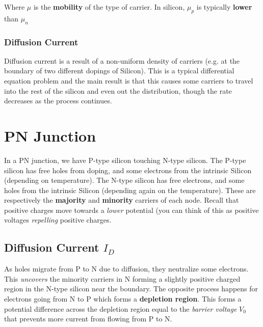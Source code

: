 \documentclass[11pt]{report}
\begin{document}
Where $\mu$ is the \textbf{mobility} of the type of carrier. In silicon, $\mu_p$ is typically \textbf{lower} than $\mu_n$


\subsubsection*{Diffusion Current}
Diffusion current is a result of a non-uniform density of carriers (e.g. at the boundary of two different dopings of Silicon). This is a typical differential equation problem and the main result is that this causes some carriers to travel into the rest of the silicon and even out the distribution, though the rate decreases as the process continues.

\section{PN Junction}

\begin{center}
\end{center}

In a PN junction, we have P-type silicon touching N-type silicon. The P-type silicon has free holes from doping, and some electrons from the intrinsic Silicon (depending on temperature). The N-type silicon has free electrons, and some holes from the intrinsic Silicon (depending again on the temperature). These are respectively the \textbf{majority} and \textbf{minority} carriers of each node. Recall that positive charges move towards a \textit{lower} potential (you can think of this as positive voltages \textit{repelling} positive charges.


\subsection*{Diffusion Current $I_D$}
As holes migrate from P to N due to diffusion, they neutralize some electrons. This \textit{uncovers} the minority carriers in N forming a slightly positive charged region in the N-type silicon near the boundary. The opposite process happens for electrons going from N to P which forms a \textbf{depletion region}. This forms a potential difference across the depletion region equal to the \textit{barrier voltage} $V_0$ that prevents more current from flowing from P to N.
\end{document}
